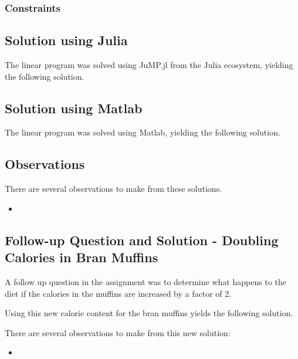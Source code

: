 \documentclass{article}
\begin{document}
    \subsubsection{Constraints}

    \subsection{Solution using Julia}

    The linear program was solved using JuMP.jl from the Julia ecosystem, yielding the following solution.


    \subsection{Solution using Matlab}

    The linear program was solved using Matlab, yielding the following solution.


    \subsection{Observations}

    There are several observations to make from these solutions.

    \begin{itemize}
        \item 
    \end{itemize}

    \subsection{Follow-up Question and Solution - Doubling Calories in Bran Muffins}

    A follow up question in the assignment was to determine what happens to the diet if the calories in the muffins are increased by a factor of 2.

    Using this new calorie content for the bran muffins yields the following solution.


    There are several observations to make from this new solution:

    \begin{itemize}
        \item 
    \end{itemize}
\end{document}
